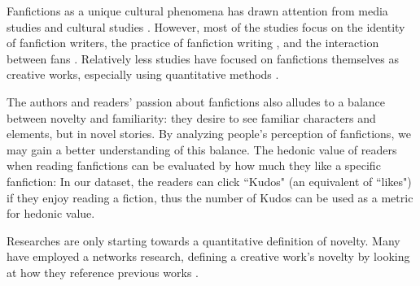 \documentclass[a4paper]{article}
\begin{document}
Fanfictions as a unique cultural phenomena has drawn attention from media studies and cultural studies \cite{thomas2011fanfiction}. However, most of the studies focus on the identity of fanfiction writers\cite{black2006language}, the practice of fanfiction writing \cite{LIT:LIT12061}, and the interaction between fans \cite{hills2015expertise}. Relatively less studies have focused on fanfictions themselves as creative works, especially using quantitative methods\cite{zhaopredicting} \cite{yung2013market}.

The authors and readers' passion about fanfictions also alludes to a balance between novelty and familiarity: they desire to see familiar characters and elements, but in novel stories. By analyzing people's perception of fanfictions, we may gain a better understanding of this balance. The hedonic value of readers when reading fanfictions can be evaluated by how much they like a specific fanfiction:  In our dataset, the readers can click ``Kudos" (an equivalent of ``likes") if they enjoy reading a fiction, thus the number of Kudos can be used as a metric for hedonic value.

Researches are only starting towards a quantitative definition of novelty. Many have employed a networks research, defining a creative work's novelty by looking at how they reference previous works \cite{elgammal2015quantifying}\cite{wang2013quantifying}\cite{2017arXiv170704239I}. 


\end{document}
